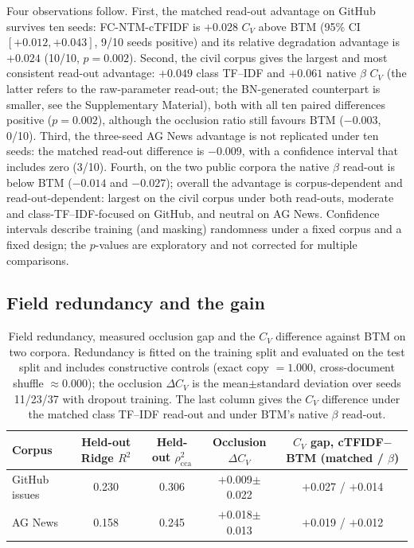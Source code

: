 \documentclass[Journal,letterpaper]{ascelike-new}
\newcommand{\fcntm}{FC-NTM}
\begin{document}
Four observations follow. First, the matched read-out advantage on GitHub survives ten seeds:
\fcntm{}-cTFIDF is $+0.028$ $C_V$ above BTM (95\% CI $[+0.012,+0.043]$, 9/10 seeds positive) and
its relative degradation advantage is $+0.024$ (10/10, $p=0.002$). Second, the civil corpus gives
the largest and most consistent read-out advantage: $+0.049$ class TF--IDF and $+0.061$ native
$\beta$ $C_V$ (the latter refers to the raw-parameter read-out; the BN-generated counterpart
is smaller, see the Supplementary Material), both with all ten paired differences positive
($p=0.002$), although the occlusion
ratio still favours BTM ($-0.003$, 0/10). Third, the three-seed AG News advantage is not replicated under ten seeds: the matched read-out difference is $-0.009$, with a confidence interval that includes zero (3/10). Fourth, on the
two public corpora the native $\beta$ read-out is below BTM ($-0.014$ and $-0.027$); overall the
advantage is corpus-dependent and read-out-dependent: largest on the civil corpus under both
read-outs, moderate and class-TF--IDF-focused on GitHub, and neutral on AG News. Confidence intervals
describe training (and masking) randomness under a fixed corpus and a fixed design; the $p$-values
are exploratory and not corrected for multiple comparisons.

\subsection{Field redundancy and the gain}

\begin{table}[t]
\centering
\caption{Field redundancy, measured occlusion gap and the $C_V$ difference against BTM on two corpora. Redundancy is fitted on the training split and evaluated on the test split and includes constructive controls (exact copy $=1.000$, cross-document shuffle $\approx0.000$); the occlusion $\Delta C_V$ is the mean$\pm$standard deviation over seeds 11/23/37 with dropout training. The last column gives the $C_V$ difference under the matched class TF--IDF read-out and under BTM's native $\beta$ read-out.}
\label{tab:conditional}
\footnotesize
\setlength{\tabcolsep}{4pt}
\begin{tabular}{@{}lcccc@{}}
\toprule
Corpus & Held-out Ridge $R^2$ & Held-out $\rho^2_{\mathrm{cca}}$
 & Occlusion $\Delta C_V$ & $C_V$ gap, cTFIDF$-$BTM (matched / $\beta$) \\
\midrule
GitHub issues & 0.230 & 0.306 & $+$0.009$\pm$0.022 & $+$0.027 / $+$0.014 \\
AG News & 0.158 & 0.245 & $+$0.018$\pm$0.013 & $+$0.019 / $+$0.012 \\
\bottomrule
\end{tabular}
\end{table}
\end{document}
